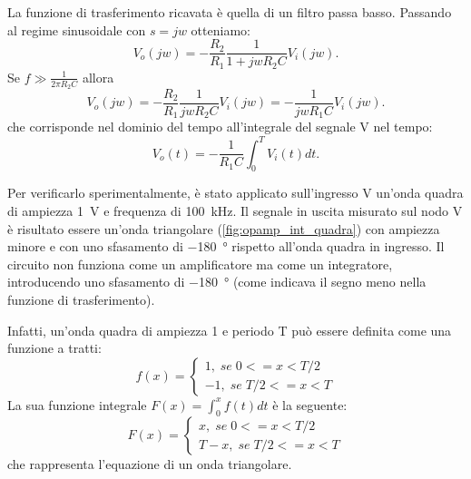 \noindent
La funzione di trasferimento ricavata è quella di un filtro passa basso. Passando al regime sinusoidale con $s=jw$ otteniamo:
\begin{equation}
	V_o(jw)=-\frac{R_2}{R_1}\frac{1}{1+jwR_2C}V_i(jw).
\end{equation}
Se $f\gg\frac{1}{2\pi R_2C}$ allora 
\begin{equation}
	V_o(jw)=-\frac{R_2}{R_1}\frac{1}{jwR_2C}V_i(jw)=-\frac{1}{jwR_1C}V_i(jw).
\end{equation}
che corrisponde nel dominio del tempo all'integrale del segnale V nel tempo:
\begin{equation}
	V_o(t)=-\frac{1}{R_1C}\int_0^TV_i(t) dt.
\end{equation}

\noindent
Per verificarlo sperimentalmente, è stato applicato sull'ingresso V un'onda quadra di ampiezza \SI{1}{\volt} e frequenza di \SI{100}{\kilo\hertz}. Il segnale in uscita misurato sul nodo V è risultato essere un'onda triangolare (\Fig\ref{fig:opamp_int_quadra}) con ampiezza minore e con uno sfasamento di \SI{-180}{\degree} rispetto all'onda quadra in ingresso. Il circuito non funziona come un amplificatore ma come un integratore, introducendo uno sfasamento di \SI{-180}{\degree} (come indicava il segno meno nella funzione di trasferimento).

\noindent
Infatti, un'onda quadra di ampiezza 1 e periodo T può essere definita come una funzione a tratti:
\begin{equation}
	f(x)=
	\begin{cases}
		1,\;se\;0<=x<T/2 \\
		-1,\;se\;T/2<=x<T 
	\end{cases}
\end{equation}
La sua funzione integrale $F(x)=\int_0^xf(t)dt$ è la seguente:
\begin{equation}
	F(x)=
	\begin{cases}
		x,\;se\;0<=x<T/2 \\
		T-x,\;se\;T/2<=x<T 
	\end{cases}
\end{equation}
che rappresenta l'equazione di un onda triangolare.

